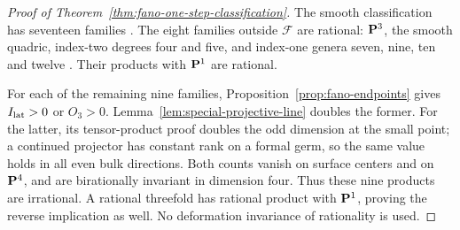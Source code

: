 \begin{proof}[Proof of Theorem~\ref{thm:fano-one-step-classification}]
The smooth classification has seventeen families
\cite[Introduction]{KuznetsovProkhorovNodal}.
The eight families outside $\mathcal F$ are rational: $\mathbf P^3$, the smooth
quadric, index-two degrees four and five, and index-one genera seven,
nine, ten and twelve \cite[Section~1.1]{KuznetsovProkhorov}.
Their products with $\mathbf P^1$ are rational.

For each of the remaining nine families, Proposition~\ref{prop:fano-endpoints}
gives $I_{\rm lat}>0$ or $O_3>0$.
Lemma~\ref{lem:special-projective-line} doubles the former.
For the latter, its tensor-product proof doubles the odd dimension at the
small point; a continued projector has constant rank on a formal germ,
so the same value holds in all even bulk directions.
Both counts vanish on surface centers and on $\mathbf P^4$, and are birationally
invariant in dimension four. Thus these nine products are irrational.
A rational threefold has rational product with $\mathbf P^1$, proving the reverse
implication as well. No deformation invariance of rationality is used.
%
%
%
\end{proof}
